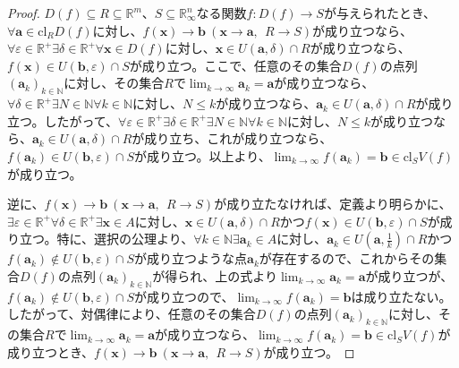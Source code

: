 \documentclass[dvipdfmx]{jsarticle}
\begin{document}
\begin{proof}
$D(f) \subseteq R \subseteq \mathbb{R}^{m}$、$S \subseteq \mathbb{R}_{\infty}^{n}$なる関数$f:D(f) \rightarrow S$が与えられたとき、$\forall\mathbf{a} \in \mathrm{cl}_{R}{D(f)}$に対し、$f\left( \mathbf{x} \right) \rightarrow \mathbf{b}\ \left( \mathbf{x} \rightarrow \mathbf{a},\ \ R \rightarrow S \right)$が成り立つなら、$\forall\varepsilon \in \mathbb{R}^{+}\exists\delta \in \mathbb{R}^{+}\forall\mathbf{x} \in D(f)$に対し、$\mathbf{x} \in U\left( \mathbf{a},\delta \right) \cap R$が成り立つなら、$f\left( \mathbf{x} \right) \in U\left( \mathbf{b},\varepsilon \right) \cap S$が成り立つ。ここで、任意のその集合$D(f)$の点列$\left( \mathbf{a}_{k} \right)_{k \in \mathbb{N}}$に対し、その集合$R$で$\lim_{k \rightarrow \infty}\mathbf{a}_{k} = \mathbf{a}$が成り立つなら、$\forall\delta \in \mathbb{R}^{+}\exists N \in \mathbb{N}\forall k \in \mathbb{N}$に対し、$N \leq k$が成り立つなら、$\mathbf{a}_{k} \in U\left( \mathbf{a},\delta \right) \cap R$が成り立つ。したがって、$\forall\varepsilon \in \mathbb{R}^{+}\exists\delta \in \mathbb{R}^{+}\exists N \in \mathbb{N}\forall k \in \mathbb{N}$に対し、$N \leq k$が成り立つなら、$\mathbf{a}_{k} \in U\left( \mathbf{a},\delta \right) \cap R$が成り立ち、これが成り立つなら、$f\left( \mathbf{a}_{k} \right) \in U\left( \mathbf{b},\varepsilon \right) \cap S$が成り立つ。以上より、$\lim_{k \rightarrow \infty}{f\left( \mathbf{a}_{k} \right)} = \mathbf{b} \in \mathrm{cl}_{S}{V(f)}$が成り立つ。\par
逆に、$f\left( \mathbf{x} \right) \rightarrow \mathbf{b}\ \left( \mathbf{x} \rightarrow \mathbf{a},\ \ R \rightarrow S \right)$が成り立たなければ、定義より明らかに、$\exists\varepsilon \in \mathbb{R}^{+}\forall\delta \in \mathbb{R}^{+}\exists\mathbf{x} \in A$に対し、$\mathbf{x} \in U\left( \mathbf{a},\delta \right) \cap R$かつ$f\left( \mathbf{x} \right) \in U\left( \mathbf{b},\varepsilon \right) \cap S$が成り立つ。特に、選択の公理より、$\forall k \in \mathbb{N}\exists\mathbf{a}_{k} \in A$に対し、$\mathbf{a}_{k} \in U\left( \mathbf{a},\frac{1}{k} \right) \cap R$かつ$f\left( \mathbf{a}_{k} \right) \notin U\left( \mathbf{b},\varepsilon \right) \cap S$が成り立つような点$\mathbf{a}_{k}$が存在するので、これからその集合$D(f)$の点列$\left( \mathbf{a}_{k} \right)_{k \in \mathbb{N}}$が得られ、上の式より$\lim_{k \rightarrow \infty}\mathbf{a}_{k} = \mathbf{a}$が成り立つが、$f\left( \mathbf{a}_{k} \right) \notin U\left( \mathbf{b},\varepsilon \right) \cap S$が成り立つので、$\lim_{k \rightarrow \infty}{f\left( \mathbf{a}_{k} \right)} = \mathbf{b}$は成り立たない。したがって、対偶律により、任意のその集合$D(f)$の点列$\left( \mathbf{a}_{k} \right)_{k \in \mathbb{N}}$に対し、その集合$R$で$\lim_{k \rightarrow \infty}\mathbf{a}_{k} = \mathbf{a}$が成り立つなら、$\lim_{k \rightarrow \infty}{f\left( \mathbf{a}_{k} \right)} = \mathbf{b} \in \mathrm{cl}_{S}{V(f)}$が成り立つとき、$f\left( \mathbf{x} \right) \rightarrow \mathbf{b}\ \left( \mathbf{x} \rightarrow \mathbf{a},\ \ R \rightarrow S \right)$が成り立つ。
\end{proof}
\end{document}
